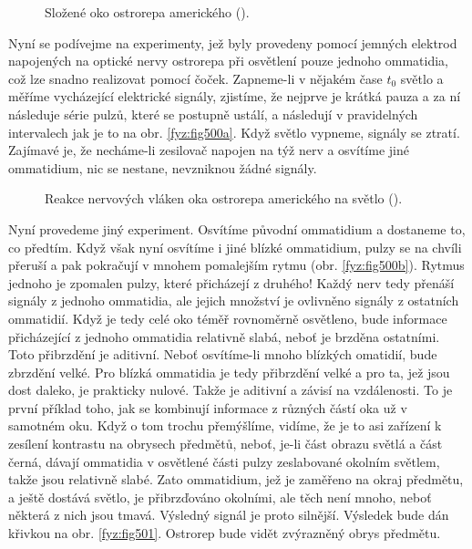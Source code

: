    \begin{figure}[hb!] %
      \centering
       \newline
      \caption{Složené oko ostrorepa amerického (\cite[s.~601]{Feynman01}).}
      \label{fyz:fig499}
    \end{figure}

    Nyní se podívejme na experimenty, jež byly provedeny pomocí jemných elektrod napojených na
    optické nervy ostrorepa při osvětlení pouze jednoho ommatidia, což lze snadno realizovat pomocí
    čoček. Zapneme-li v nějakém čase \(t_0\) světlo a měříme vycházející elektrické signály,
    zjistíme, že nejprve je krátká pauza a za ní následuje série pulzů, které se postupně ustálí, a
    následují v pravidelných intervalech jak je to na obr. \ref {fyz:fig500a}. Když světlo vypneme,
    signály se ztratí. Zajímavé je, že necháme-li zesilovač napojen na týž nerv a osvítíme jiné
    ommatidium, nic se nestane, nevzniknou žádné signály.

    \begin{figure}[hb!] %
      \centering
        \newline
      \caption{Reakce nervových vláken oka ostrorepa amerického na světlo (\cite[s.~601]{Feynman01}).}
      \label{fyz:fig500}
    \end{figure}

    Nyní provedeme jiný experiment. Osvítíme původní ommatidium a dostaneme to, co předtím. Když
    však nyní osvítíme i jiné blízké ommatidium, pulzy se na chvíli přeruší a pak pokračují v mnohem
    pomalejším rytmu (obr. \ref{fyz:fig500b}). Rytmus jednoho je zpomalen pulzy, které přicházejí z
    druhého! Každý nerv tedy přenáší signály z jednoho ommatidia, ale jejich množství je ovlivněno
    signály z ostatních ommatidií. Když je tedy celé oko téměř rovnoměrně osvětleno, bude informace
    přicházející z jednoho ommatidia relativně slabá, neboť je brzděna ostatními. Toto přibrzdění je
    aditivní. Neboť osvítíme-li mnoho blízkých omatidií, bude zbrzdění velké. Pro blízká ommatidia
    je tedy přibrzdění velké a pro ta, jež jsou dost daleko, je prakticky nulové. Takže je aditivní
    a závisí na vzdálenosti. To je první příklad toho, jak se kombinují informace z různých částí
    oka už v samotném oku. Když o tom trochu přemýšlíme, vidíme, že je to asi zařízení k zesílení
    kontrastu na obrysech předmětů, neboť, je-li část obrazu světlá a část černá, dávají ommatidia v
    osvětlené části pulzy zeslabované okolním světlem, takže jsou relativně slabé. Zato ommatidium,
    jež je zaměřeno na okraj předmětu, a ještě dostává světlo, je přibrzďováno okolními, ale těch
    není mnoho, neboť některá z nich jsou tmavá. Výsledný signál je proto silnější. Výsledek bude
    dán křivkou na obr. \ref{fyz:fig501}. Ostrorep bude vidět zvýrazněný obrys předmětu.
    
